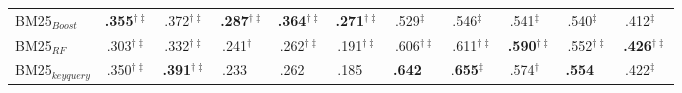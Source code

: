 \begin{table}[t]
\begin{tabular}{@{}l@{}cccccccccc@{}}
    \midrule
    
    BM25$_{Boost}$ & \bfseries.355$^{\dagger\ddagger}$ & .372$^{\dagger\ddagger}$ & \bfseries.287$^{\dagger\ddagger}$ & \bfseries.364$^{\dagger\ddagger}$ & \bfseries.271$^{\dagger\ddagger}$ & .529$^{\ddagger\phantom{\dagger}}$ & .546$^{\ddagger\phantom{\dagger}}$ & .541$^{\ddagger\phantom{\dagger}}$ & .540$^{\ddagger\phantom{\dagger}}$ & .412$^{\ddagger\phantom{\dagger}}$ \\
    BM25$_{RF}$ & .303$^{\dagger\ddagger}$ & .332$^{\dagger\ddagger}$ & .241$^{\dagger\phantom{\ddagger}}$ & .262$^{\dagger\ddagger}$ & .191$^{\dagger\ddagger}$ & .606$^{\dagger\ddagger}$ & .611$^{\dagger\ddagger}$ & \bfseries.590$^{\dagger\ddagger}$ & .552$^{\dagger\ddagger}$ & \bfseries .426$^{\dagger\ddagger}$ \\
    BM25$_{keyquery}$ & .350$^{\dagger\ddagger}$ & \bfseries .391$^{\dagger\ddagger}$ & .233$^{\phantom{\dagger\ddagger}}$ & .262$^{\phantom{\dagger\ddagger}}$ & .185$^{\phantom{\dagger\ddagger}}$ & \bfseries.642$^{\phantom{\dagger\ddagger}}$ & .\bfseries 655$^{\ddagger\phantom{\dagger}}$ & .574$^{\dagger\phantom{\ddagger}}$ & \bfseries .554$^{\phantom{\dagger\ddagger}}$ & .422$^{\ddagger\phantom{\dagger}}$ \\



\bottomrule
\end{tabular}
\end{table}
